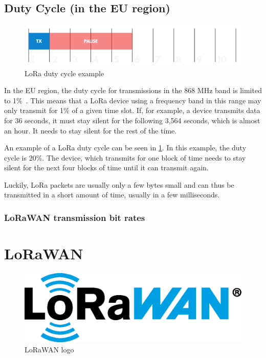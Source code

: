 \subsection{Duty Cycle (in the \acs{EU} region)}

\begin{figure}
    \centering
    \includegraphics[width=.8\textwidth]{pictures/lora/duty-cycle-single-channel-off-air.png}
    \caption{\ac{LoRa} duty cycle example~\protect\cite{the_things_industries_bv_duty_nodate}}\label{pic:lora-duty-cycle}
\end{figure}

In the \ac{EU} region, the duty cycle for transmissions in the 868 MHz band is limited to 1\%~\cite{etsi_etsi_2012}.
This means that a \ac{LoRa} device using a frequency band in this range may only transmit for 1\% of a given time slot.
If, for example, a device transmits data for 36 seconds, it must stay silent for the following 3,564 seconds, which is almost an hour.
It needs to stay silent for the rest of the time.

An example of a \ac{LoRa} duty cycle can be seen in \cref{pic:lora-duty-cycle}.
In this example, the duty cycle is 20\%.
The device, which transmits for one block of time needs to stay silent for the next four blocks of time until it can transmit again.

Luckily, LoRa packets are usually only a few bytes small and can thus be transmitted in a short amount of time, usually in a few milliseconds.

\subsubsection{\ac{LoRaWAN} transmission bit rates}


\section{\acf{LoRaWAN}}\label{sec:lorawan}

\begin{figure}
    \centering
    \includegraphics[width=.4\textwidth]{pictures/logos/LoRaWAN_Logo.eps}
    \caption{\ac{LoRaWAN} logo~\protect\cite{lora_alliance_francais_2022}}
\end{figure}

